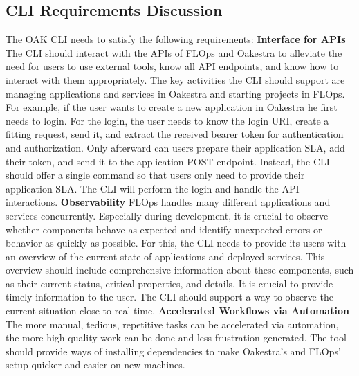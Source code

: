 \subsection{CLI Requirements Discussion}

The OAK CLI needs to satisfy the following requirements:
\vspace{5mm}
\newline
\textbf{Interface for APIs}\newline
The CLI should interact with the APIs of FLOps and Oakestra to alleviate the need for users to use external tools, know all API endpoints, and know how to interact with them appropriately.
The key activities the CLI should support are managing applications and services in Oakestra and starting projects in FLOps.
For example, if the user wants to create a new application in Oakestra he first needs to login.
For the login, the user needs to know the login URI, create a fitting request, send it, and extract the received bearer token for authentication and authorization.
Only afterward can users prepare their application SLA, add their token, and send it to the application POST endpoint.
Instead, the CLI should offer a single command so that users only need to provide their application SLA. 
The CLI will perform the login and handle the API interactions.
\vspace{5mm}
\newline
\textbf{Observability}\newline
FLOps handles many different applications and services concurrently.
Especially during development, it is crucial to observe whether components behave as expected and identify unexpected errors or behavior as quickly as possible.
For this, the CLI needs to provide its users with an overview of the current state of applications and deployed services.
This overview should include comprehensive information about these components, such as their current status, critical properties, and details.
It is crucial to provide timely information to the user.
The CLI should support a way to observe the current situation close to real-time.
\vspace{5mm}
\newline
\textbf{Accelerated Workflows via Automation}\newline
The more manual, tedious, repetitive tasks can be accelerated via automation, the more high-quality work can be done and less frustration generated.
The tool should provide ways of installing dependencies to make Oakestra's and FLOps' setup quicker and easier on new machines.
